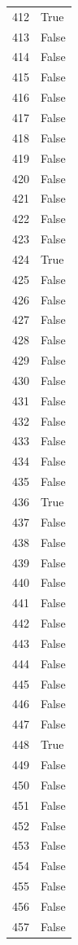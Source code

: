\documentclass[
  letterpaper,
  DIV=11,
  numbers=noendperiod]{scrreprt}
\begin{document}
\begin{tabular}{ll}
412  &   True \\
413  &  False \\
414  &  False \\
415  &  False \\
416  &  False \\
417  &  False \\
418  &  False \\
419  &  False \\
420  &  False \\
421  &  False \\
422  &  False \\
423  &  False \\
424  &   True \\
425  &  False \\
426  &  False \\
427  &  False \\
428  &  False \\
429  &  False \\
430  &  False \\
431  &  False \\
432  &  False \\
433  &  False \\
434  &  False \\
435  &  False \\
436  &   True \\
437  &  False \\
438  &  False \\
439  &  False \\
440  &  False \\
441  &  False \\
442  &  False \\
443  &  False \\
444  &  False \\
445  &  False \\
446  &  False \\
447  &  False \\
448  &   True \\
449  &  False \\
450  &  False \\
451  &  False \\
452  &  False \\
453  &  False \\
454  &  False \\
455  &  False \\
456  &  False \\
457  &  False \\

\end{tabular}
\end{document}
